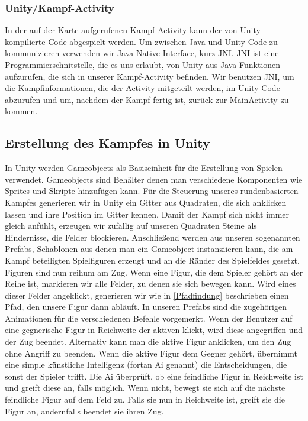 \documentclass[extern,palatino]{cgBA}
\begin{document}
\subsubsection{Unity/Kampf-Activity}
In der auf der Karte aufgerufenen Kampf-Activity kann der von Unity kompilierte Code abgespielt werden. Um zwischen Java und Unity-Code zu kommunizieren verwenden wir Java Native Interface, kurz JNI. JNI ist eine Programmierschnitstelle, die es uns erlaubt, von Unity aus Java Funktionen aufzurufen, die sich in unserer Kampf-Activity befinden. Wir benutzen JNI, um die Kampfinformationen, die der Activity mitgeteilt werden, im Unity-Code abzurufen und um, nachdem der Kampf fertig ist, zurück zur MainActivity zu kommen.
\newpage
\subsection{Erstellung des Kampfes in Unity}
In Unity werden Gameobjects als Basiseinheit für die Erstellung von Spielen verwendet. Gameobjects sind Behälter denen man verschiedene Komponenten wie Sprites und Skripte hinzufügen kann.%
Für die Steuerung unseres rundenbasierten Kampfes generieren wir in Unity ein Gitter aus Quadraten, die sich anklicken lassen und ihre Position im Gitter kennen. Damit der Kampf sich nicht immer gleich anfühlt, erzeugen wir zufällig auf unseren Quadraten Steine als Hindernisse, die Felder blockieren. Anschließend werden aus unseren sogenannten Prefabs, Schablonen aus denen man ein Gameobject instanziieren kann, die am Kampf beteiligten Spielfiguren erzeugt und an die Ränder des Spielfeldes gesetzt. Figuren sind nun reihum am Zug. Wenn eine Figur, die dem Spieler gehört an der Reihe ist, markieren wir alle Felder, zu denen sie sich bewegen kann. Wird eines dieser Felder angeklickt, generieren wir wie in \ref{Pfadfindung} beschrieben einen Pfad, den unsere Figur dann abläuft. In unseren Prefabs sind die zugehörigen Animationen für die verschiedenen Befehle vorgemerkt. Wenn der Benutzer auf eine gegnerische Figur in Reichweite der aktiven klickt, wird diese angegriffen und der Zug beendet. Alternativ kann man die aktive Figur anklicken, um den Zug ohne Angriff zu beenden. Wenn die aktive Figur dem Gegner gehört, übernimmt eine simple künstliche Intelligenz (fortan Ai genannt) die Entscheidungen, die sonst der Spieler trifft. Die Ai überprüft, ob eine feindliche Figur in Reichweite ist und greift diese an, falls möglich. Wenn nicht, bewegt sie sich auf die nächste feindliche Figur auf dem Feld zu. Falls sie nun in Reichweite ist, greift sie die Figur an, andernfalls beendet sie ihren Zug.
\end{document}
